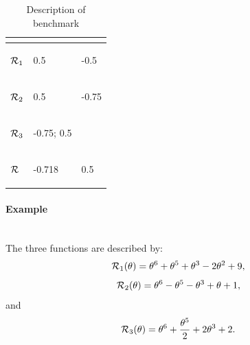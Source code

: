 \begin{table}[h!]
	\centering
	\caption{Description of benchmark \exSix}
	\begin{tabular}{lll}
		
		\toprule
		\begin{bf} \diagbox{Functions}{Minimums} \end{bf} & \begin{bf}\mg\end{bf} & \begin{bf}\ml\end{bf} \\
		\midrule
		
		\begin{bf}$\mathcal{R}_1$\end{bf} & 0.5 & -0.5  \\ \midrule
		\begin{bf}$\mathcal{R}_2$\end{bf} & 0.5 & -0.75 \\ \midrule
		\begin{bf}$\mathcal{R}_3$\end{bf} & -0.75; 0.5  &  \\ \midrule
		\begin{bf}$\mathcal{R}$\end{bf}   & -0.718 &  0.5 \\ \bottomrule
	\end{tabular}
	\label{ex6_example}
\end{table}

\paragraph{Example \exSeven}
~~\\
The three functions are described by:
\begin{equation*}
	\mathcal{R}_1(\theta) = \theta^6+\theta^5+\theta^3-2\theta^2+9,
\end{equation*}
\begin{equation*}
	\mathcal{R}_2(\theta) = \theta^6-\theta^5-\theta^3+\theta+1,
\end{equation*}
and
\begin{equation*}
	\mathcal{R}_3(\theta) = \theta^6+\frac{\theta^5}{2}+2\theta^3+2.
\end{equation*}

